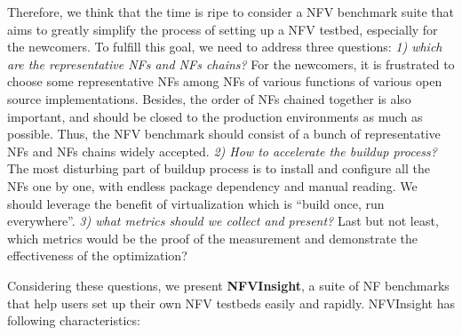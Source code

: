 Therefore, we think that the time is ripe to consider a NFV benchmark suite that aims to greatly simplify the process of setting up a NFV testbed, especially for the newcomers. To fulfill this goal, we need to address three questions:
\textit{1) which are the representative NFs and NFs chains?} For the newcomers, it is frustrated to choose some representative NFs among NFs of various functions of various open source implementations. Besides, the order of NFs chained together is also important, and should be closed to the production environments as much as possible. Thus, the NFV benchmark should consist of a bunch of representative NFs and NFs chains widely accepted.
\textit{2) How to accelerate the buildup process?} The most disturbing part of buildup process is to install and configure all the NFs one by one, with endless package dependency and manual reading. We should leverage the benefit of virtualization which is ``build once, run everywhere''.
\textit{3) what metrics should we collect and present?} Last but not least, which metrics would be the proof of the measurement and demonstrate the effectiveness of the optimization?

Considering these questions, we present \textbf{NFVInsight}, a suite of NF benchmarks that help users set up their own NFV testbeds easily and rapidly. NFVInsight has following characteristics:






